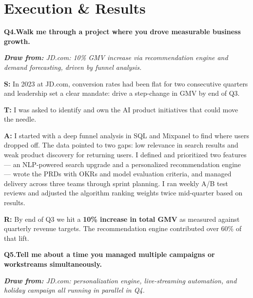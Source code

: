 \documentclass[10pt, letterpaper]{article}
\newcommand{\q}[2]{%
    \smallskip
    \noindent\textbf{\small Q#1.}\quad\textbf{#2}
    \vspace{3pt}
}
\newcommand{\hint}[1]{%
    \begin{notebox}
    \footnotesize\textit{\textbf{Draw from:} #1}
    \end{notebox}
}
\newcommand{\s}[1]{\textbf{\textcolor{starlabel}{S:}} #1}
\newcommand{\ta}[1]{\textbf{\textcolor{starlabel}{T:}} #1}
\newcommand{\ac}[1]{\textbf{\textcolor{starlabel}{A:}} #1}
\newcommand{\res}[1]{\textbf{\textcolor{starlabel}{R:}} #1}
\begin{document}
\section{Execution \& Results}

\q{4}{Walk me through a project where you drove measurable business growth.}
\hint{JD.com: 10\% GMV increase via recommendation engine and demand forecasting, driven by funnel analysis.}

\begin{answerbox}
\footnotesize
\s{In 2023 at JD.com, conversion rates had been flat for two consecutive quarters and leadership set a clear mandate: drive a step-change in GMV by end of Q3.}

\medskip
\ta{I was asked to identify and own the AI product initiatives that could move the needle.}

\medskip
\ac{I started with a deep funnel analysis in SQL and Mixpanel to find where users dropped off. The data pointed to two gaps: low relevance in search results and weak product discovery for returning users. I defined and prioritized two features --- an NLP-powered search upgrade and a personalized recommendation engine --- wrote the PRDs with OKRs and model evaluation criteria, and managed delivery across three teams through sprint planning. I ran weekly A/B test reviews and adjusted the algorithm ranking weights twice mid-quarter based on results.}

\medskip
\res{By end of Q3 we hit a \textbf{10\% increase in total GMV} as measured against quarterly revenue targets. The recommendation engine contributed over 60\% of that lift.}
\end{answerbox}

\q{5}{Tell me about a time you managed multiple campaigns or workstreams simultaneously.}
\hint{JD.com: personalization engine, live-streaming automation, and holiday campaign all running in parallel in Q4.}
\end{document}
